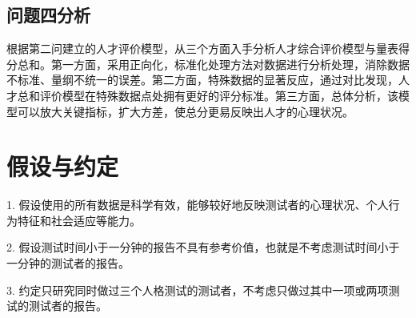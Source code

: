 \documentclass[withoutpreface,bwprint]{cumcmthesis} %
\begin{document}
\subsection{问题四分析}

根据第二问建立的人才评价模型，从三个方面入手分析人才综合评价模型与量表得分总和。第一方面，采用正向化，标准化处理方法对数据进行分析处理，消除数据不标准、量纲不统一的误差。第二方面，特殊数据的显著反应，通过对比发现，人才总和评价模型在特殊数据点处拥有更好的评分标准。第三方面，总体分析，该模型可以放大关键指标，扩大方差，使总分更易反映出人才的心理状况。

\section{假设与约定}
1. 假设使用的所有数据是科学有效，能够较好地反映测试者的心理状况、个人行为特征和社会适应等能力。

2. 假设测试时间小于一分钟的报告不具有参考价值，也就是不考虑测试时间小于一分钟的测试者的报告。

3. 约定只研究同时做过三个人格测试的测试者，不考虑只做过其中一项或两项测试的测试者的报告。
\end{document}
